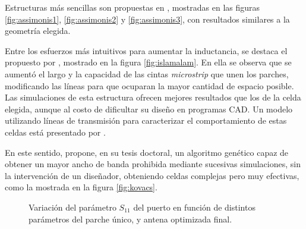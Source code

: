Estructuras más sencillas son propuestas en \cite{Asimonis:designoptimization}, mostradas en las figuras \ref{fig:assimonis1}, \ref{fig:assimonis2} y \ref{fig:assimonis3}, con resultados similares a la geometría elegida.

Entre los esfuerzos más intuitivos para aumentar la inductancia, se destaca el propuesto por \cite{IslamAlam:CompactEBG}, mostrado en la figura \ref{fig:islamalam}. En ella se observa que se aumentó el largo y la capacidad de las cintas \textit{microstrip} que unen los parches, modificando las líneas para que ocuparan la mayor cantidad de espacio posible. Las simulaciones de esta estructura ofrecen mejores resultados que los de la celda elegida, aunque al costo de dificultar su diseño en programas \textsc{CAD}. Un modelo utilizando líneas de transmisión para caracterizar el comportamiento de estas celdas está presentado por \cite{Venkateswaran:Thesis}. 

En este sentido, \cite{Kovacs:DesignOptimization} propone, en su tesis doctoral, un algoritmo genético capaz de obtener un mayor ancho de banda prohibida mediante sucesivas simulaciones, sin la intervención de un diseñador, obteniendo celdas complejas pero muy efectivas, como la mostrada en la figura \ref{fig:kovacs}.


\begin{figure}[H]
	\centering 
	\hspace{30pt}
	\hspace{30pt}
	\hspace{30pt}
	\caption{Variación del parámetro $S_{11}$ del puerto en función de distintos parámetros del parche único, y antena optimizada final.}
	\label{fig:simulaciones-microstrip-1parche}
\end{figure}

